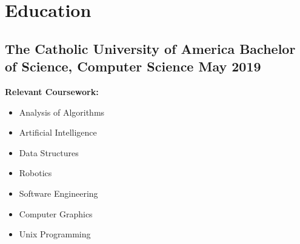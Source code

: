 \section{Education}
\subsection{The Catholic University of America \hspace {5pt} Bachelor of Science, Computer Science \hfill  May 2019 }

\noindent
\textbf{Relevant Coursework:}
\begin{multicols}{2}
	\begin{itemize}
	\item Analysis of Algorithms
	\item Artificial Intelligence
	\item Data Structures
	\item Robotics
	\item Software Engineering
	\item Computer Graphics
	\item Unix Programming
	\end{itemize}
\end{multicols}

